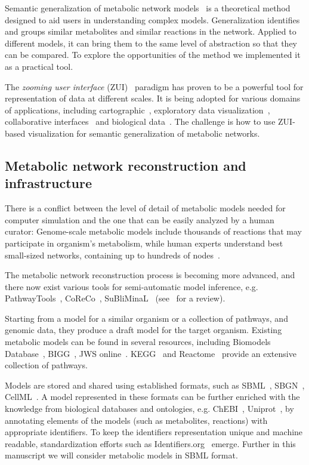 \documentclass{bmcart}
\begin{document}
Semantic generalization of metabolic network models~\cite{Zhukova2014} is a theoretical method designed to aid users in understanding complex models. Generalization identifies and groups similar metabolites and similar reactions in the network.
Applied to different models, it can bring them to the same level of abstraction so that they can be compared.
To explore the opportunities of the method we implemented it as a practical tool.

The \emph{zooming user interface} (ZUI)~\cite{Bederson1998} paradigm has proven to be a powerful tool for representation of data at different scales. It is being adopted for various domains of applications, including cartographic~\cite{Nivala2008}, exploratory data visualization~\cite{Roberts2005}, collaborative interfaces~\cite{Laufer2011} and biological data~\cite{Pook1998, Hu2007}. The challenge is how to use ZUI-based visualization for semantic generalization of metabolic networks.

\subsection*{Metabolic network reconstruction and infrastructure}
There is a conflict between the level of detail of metabolic models needed for computer simulation and the one that can be easily analyzed by a human curator: Genome-scale metabolic models include thousands of reactions that may participate in organism's metabolism, while human experts understand best small-sized networks, containing up to hundreds of nodes~\cite{VonLandesberger2011,Herman2000}.

The metabolic network reconstruction process is becoming more advanced, and there now exist various tools for semi-automatic model inference, e.g. PathwayTools~\cite{Karp2002}, CoReCo~\cite{Pitkanen2014}, SuBliMinaL~\cite{Swainston2011} (see~\cite{Hamilton2014} for a review).

Starting from a model for a similar organism or a collection of pathways, and genomic data, they produce a draft model for the target organism. Existing metabolic models can be found in several resources, including Biomodels Database~\cite{Li10}, BIGG~\cite{Schellenberger2010}, JWS online~\cite{Snoep2003}. KEGG~\cite{Kanehisa12} and Reactome~\cite{Milacic2012, Croft2013} provide an extensive collection of pathways. 

Models are stored and shared using established formats, such as SBML~\cite{Hucka2003}, SBGN~\cite{LeNovere2009}, CellML~\cite{Lloyd2004}. A model represented in these formats can be further enriched with the knowledge from biological databases and ontologies, e.g. ChEBI~\cite{deMatos10}, Uniprot~\cite{TheUniProtConsortium2014}, by annotating elements of the models (such as metabolites, reactions) with appropriate identifiers. To keep the identifiers representation unique and machine readable, standardization efforts such as Identifiers.org~\cite{Juty2012} emerge. Further in this manuscript we will consider metabolic models in SBML format.
\end{document}
